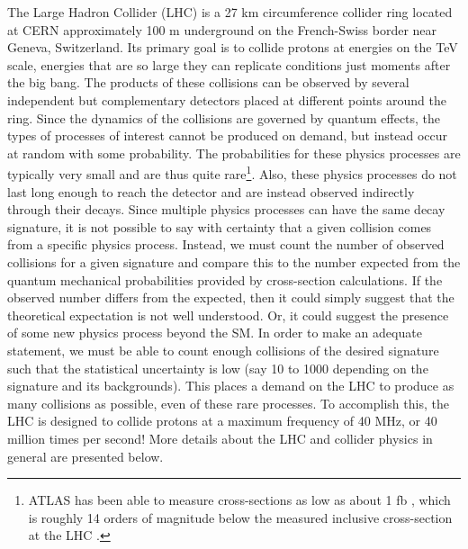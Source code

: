 



The Large Hadron Collider (LHC) \cite{lhc} is
a 27 km circumference collider ring
located at CERN approximately 100 m underground on the 
French-Swiss border near Geneva, Switzerland.
Its primary goal is to collide protons at energies on the TeV scale, 
energies that are so large they can replicate conditions just moments
after the big bang.
The products of these collisions can 
be observed
by several independent but complementary detectors placed at different
points around the ring. 
Since the dynamics of the collisions are governed by quantum effects, 
the types of processes of interest cannot be
produced on demand, but instead occur at random with some
probability.
The probabilities for these physics processes are 
typically very small and are thus quite
rare\footnote{ATLAS has been able to measure cross-sections as 
low as about 1 fb \cite{PhysRevLett.113.141803}, which is roughly
14 orders of magnitude below the measured inclusive cross-section
at the LHC \cite{Aad:2014dca}.}.
Also, these physics processes do not last long
enough to reach the detector and are instead observed indirectly through their
decays. Since multiple physics processes can have the same decay 
signature, it is not possible to say with certainty that a given 
collision comes from a specific physics process. Instead, 
we must count the number of observed collisions for a given signature
and compare this to the number expected from the 
quantum mechanical probabilities provided by cross-section
calculations.  If the observed number differs
from the expected, then it could simply suggest that the theoretical expectation
is not well understood.  Or, it could suggest the presence of some new physics
process beyond the SM.
In order to make an adequate statement, we must be able to count
enough collisions of the desired signature 
such that the statistical uncertainty is low
(say 10 to 1000 depending on the signature and its backgrounds).  
This places a demand
on the LHC to produce as many collisions as possible, even of these rare
processes. To accomplish this, the LHC is designed to collide
protons at a maximum frequency of 40 MHz, or 40 million times per second!
More details about the LHC and collider physics in general are presented
below.



